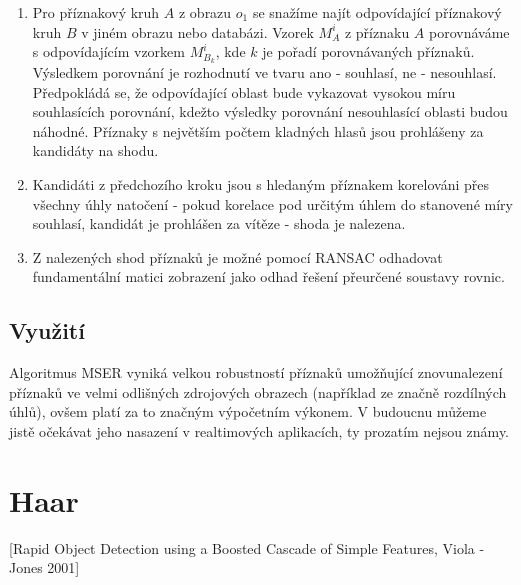 	\begin{enumerate}
		\item Pro příznakový kruh $A$ z obrazu $o_1$ se snažíme najít odpovídající příznakový kruh $B$ v jiném obrazu nebo databázi. Vzorek $M_{A}^i$ z příznaku $A$ porovnáváme s odpovídajícím vzorkem $M_{B_{k}}^i$, kde $k$ je pořadí porovnávaných příznaků. Výsledkem porovnání je rozhodnutí ve tvaru ano - souhlasí, ne - nesouhlasí. Předpokládá se, že odpovídající oblast bude vykazovat vysokou míru souhlasících porovnání, kdežto výsledky porovnání nesouhlasící oblasti budou náhodné. Příznaky s největším počtem kladných hlasů jsou prohlášeny za kandidáty na shodu.
		
		\item Kandidáti z předchozího kroku jsou s hledaným příznakem korelováni přes všechny úhly natočení - pokud korelace pod určitým úhlem do stanovené míry souhlasí, kandidát je prohlášen za vítěze - shoda je nalezena.
		
		\item Z nalezených shod příznaků je možné pomocí RANSAC odhadovat fundamentální matici zobrazení jako odhad řešení přeurčené soustavy rovnic.
	\end{enumerate}
	
	\subsection{Využití}
		Algoritmus MSER vyniká velkou robustností příznaků umožňující znovunalezení příznaků ve velmi odlišných zdrojových obrazech (například ze značně rozdílných úhlů), ovšem platí za to značným výpočetním výkonem. V budoucnu můžeme jistě očekávat jeho nasazení v realtimových aplikacích, ty prozatím nejsou známy.
	

\section{Haar}

[Rapid Object Detection using a Boosted Cascade of Simple Features, Viola -Jones 2001]

